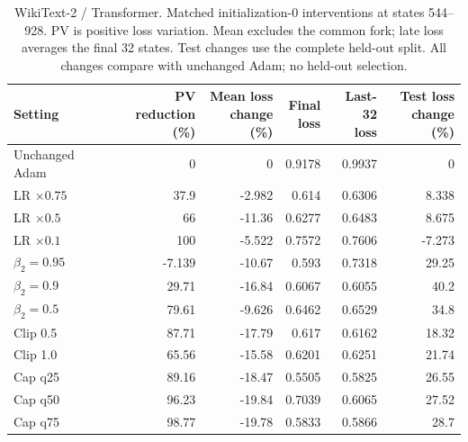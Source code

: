 \begin{table}[t]
\centering
\small
\setlength{\tabcolsep}{4pt}
\begin{tabular}{lrrrrr}
\toprule
Setting & \shortstack{PV reduction\\(\%)} & \shortstack{Mean loss\\change (\%)} & \shortstack{Final\\loss} & \shortstack{Last-32\\loss} & \shortstack{Test loss\\change (\%)} \\
\midrule
Unchanged Adam & 0 & 0 & 0.9178 & 0.9937 & 0 \\
LR $\times0.75$ & 37.9 & -2.982 & 0.614 & 0.6306 & 8.338 \\
LR $\times0.5$ & 66 & -11.36 & 0.6277 & 0.6483 & 8.675 \\
LR $\times0.1$ & 100 & -5.522 & 0.7572 & 0.7606 & -7.273 \\
$\beta_2=0.95$ & -7.139 & -10.67 & 0.593 & 0.7318 & 29.25 \\
$\beta_2=0.9$ & 29.71 & -16.84 & 0.6067 & 0.6055 & 40.2 \\
$\beta_2=0.5$ & 79.61 & -9.626 & 0.6462 & 0.6529 & 34.8 \\
Clip 0.5 & 87.71 & -17.79 & 0.617 & 0.6162 & 18.32 \\
Clip 1.0 & 65.56 & -15.58 & 0.6201 & 0.6251 & 21.74 \\
Cap q25 & 89.16 & -18.47 & 0.5505 & 0.5825 & 26.55 \\
Cap q50 & 96.23 & -19.84 & 0.7039 & 0.6065 & 27.52 \\
Cap q75 & 98.77 & -19.78 & 0.5833 & 0.5866 & 28.7 \\
\bottomrule
\end{tabular}
\caption{WikiText-2 / Transformer. Matched initialization-0 interventions at states 544--928. PV is positive loss variation. Mean excludes the common fork; late loss averages the final 32 states. Test changes use the complete held-out split. All changes compare with unchanged Adam; no held-out selection.}
\end{table}

